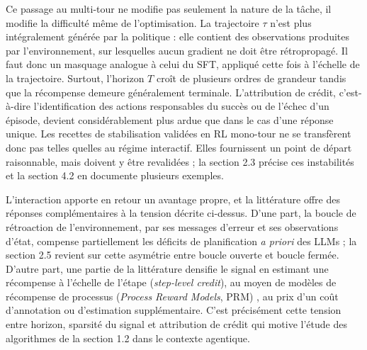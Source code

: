 \documentclass[11pt,a4paper]{article}
\begin{document}
Ce passage au multi-tour ne modifie pas seulement la nature de la tâche, il modifie la difficulté même de l'optimisation. La trajectoire $\tau$ n'est plus intégralement générée par la politique : elle contient des observations produites par l'environnement, sur lesquelles aucun gradient ne doit être rétropropagé. Il faut donc un masquage analogue à celui du SFT, appliqué cette fois à l'échelle de la trajectoire. Surtout, l'horizon $T$ croît de plusieurs ordres de grandeur tandis que la récompense demeure généralement terminale. L'attribution de crédit, c'est-à-dire l'identification des actions responsables du succès ou de l'échec d'un épisode, devient considérablement plus ardue que dans le cas d'une réponse unique. Les recettes de stabilisation validées en RL mono-tour ne se transfèrent donc pas telles quelles au régime interactif. Elles fournissent un point de départ raisonnable, mais doivent y être revalidées ; la section 2.3 précise ces instabilités et la section 4.2 en documente plusieurs exemples.

L'interaction apporte en retour un avantage propre, et la littérature offre des réponses complémentaires à la tension décrite ci-dessus. D'une part, la boucle de rétroaction de l'environnement, par ses messages d'erreur et ses observations d'état, compense partiellement les déficits de planification \emph{a priori} des LLMs \cite{yao2023react, kambhampati2024llmmodulo} ; la section 2.5 revient sur cette asymétrie entre boucle ouverte et boucle fermée. D'autre part, une partie de la littérature densifie le signal en estimant une récompense à l'échelle de l'étape (\emph{step-level credit}), au moyen de modèles de récompense de processus (\emph{Process Reward Models}, PRM) \cite{lightman2023verify}, au prix d'un coût d'annotation ou d'estimation supplémentaire. C'est précisément cette tension entre horizon, sparsité du signal et attribution de crédit qui motive l'étude des algorithmes de la section 1.2 dans le contexte agentique.
\end{document}
